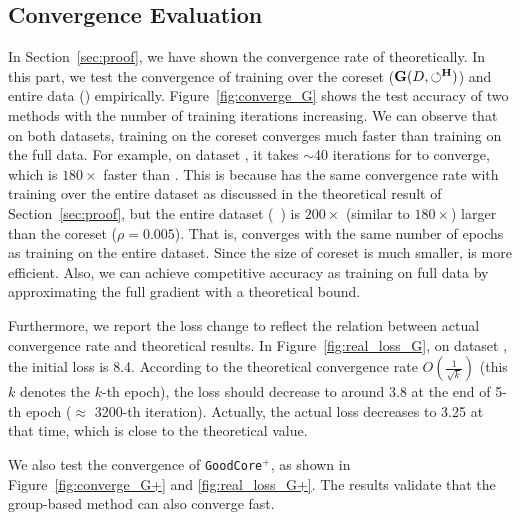 \vspace{-0.5em}
\subsection{Convergence Evaluation}

In Section~\ref{sec:proof}, we have shown  the convergence rate of \ours theoretically. In this part, we test the convergence of training over the coreset ($\mathbf{G}(D,\circlearrowleft^\mathbf{H})$) and entire data (\truth) empirically.  Figure~\ref{fig:converge_G} shows the test accuracy of two methods with the number of training iterations increasing. We can observe that on both datasets, training on the coreset converges much faster than training on the full data. 
For example, on dataset \adult, it takes $\sim$40 iterations for \ours to converge, which is  $180\times$ faster than {\truth}. This is because \ours has the same convergence rate with training over the entire dataset as discussed in the theoretical result of Section~\ref{sec:proof}, but the entire dataset (\eg  ~\adult) is $200\times$ (similar to $180\times$) larger than the coreset ($\rho=0.005$).
 That is, \ours converges with the same number of epochs  as training on the entire dataset. Since the size of coreset is much smaller, \ours is more efficient. Also, we can achieve competitive accuracy as training on full data by approximating the full gradient with a theoretical bound. 
 

Furthermore, we report the loss change to reflect the relation between  actual convergence rate and theoretical results. In Figure~\ref{fig:real_loss_G}, on dataset \hr, the initial loss is 8.4. According to the theoretical convergence rate $O(\frac{1}{\sqrt{k}})$ (this $k$ denotes the $k$-th epoch),  the loss should decrease to around 3.8 at the end of 5-th epoch ($\approx$ 3200-th iteration). Actually,  the  actual loss decreases to 3.25 at that time, which is close to the theoretical value.

We also test the convergence of \texttt{GoodCore}$^+$, as shown in Figure~\ref{fig:converge_G+} and 	\ref{fig:real_loss_G+}. The results  validate that the group-based method can also converge fast.


